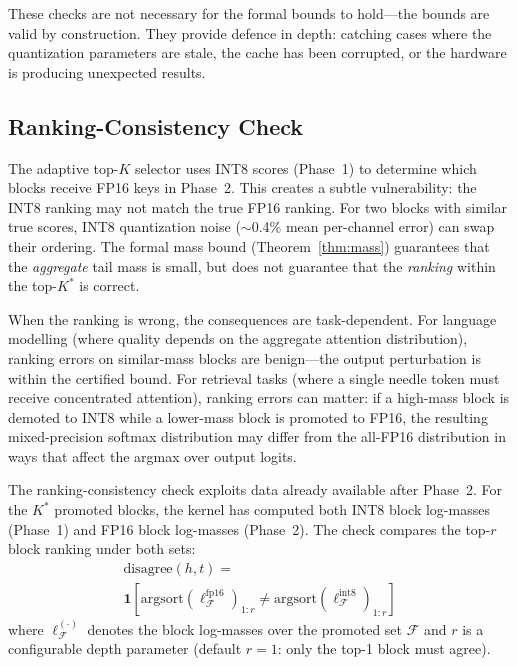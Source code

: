 \documentclass[10pt,twocolumn,a4paper]{article}
\theoremstyle{definition}
\theoremstyle{remark}
\begin{document}
These checks are not necessary for the formal bounds to hold---the bounds are valid by construction.  They provide defence in depth: catching cases where the quantization parameters are stale, the cache has been corrupted, or the hardware is producing unexpected results.

\subsection{Ranking-Consistency Check}
\label{sec:ranking_consistency}

The adaptive top-$K$ selector uses INT8 scores (Phase~1) to determine which blocks receive FP16 keys in Phase~2.  This creates a subtle vulnerability: the INT8 ranking may not match the true FP16 ranking.  For two blocks with similar true scores, INT8 quantization noise ($\sim$0.4\% mean per-channel error) can swap their ordering.  The formal mass bound (Theorem~\ref{thm:mass}) guarantees that the \emph{aggregate} tail mass is small, but does not guarantee that the \emph{ranking} within the top-$K^*$ is correct.

When the ranking is wrong, the consequences are task-dependent.  For language modelling (where quality depends on the aggregate attention distribution), ranking errors on similar-mass blocks are benign---the output perturbation is within the certified bound.  For retrieval tasks (where a single needle token must receive concentrated attention), ranking errors can matter: if a high-mass block is demoted to INT8 while a lower-mass block is promoted to FP16, the resulting mixed-precision softmax distribution may differ from the all-FP16 distribution in ways that affect the argmax over output logits.

The ranking-consistency check exploits data already available after Phase~2.  For the $K^*$ promoted blocks, the kernel has computed both INT8 block log-masses (Phase~1) and FP16 block log-masses (Phase~2).  The check compares the top-$r$ block ranking under both sets:
\begin{multline}
  \mathrm{disagree}(h, t) = \\
  \mathbf{1}\!\left[\mathrm{argsort}(\ell^{\mathrm{fp16}}_{\mathcal{F}})_{1:r}
  \neq \mathrm{argsort}(\ell^{\mathrm{int8}}_{\mathcal{F}})_{1:r}\right]
\end{multline}
where $\ell^{(\cdot)}_{\mathcal{F}}$ denotes the block log-masses over the promoted set $\mathcal{F}$ and $r$ is a configurable depth parameter (default $r{=}1$: only the top-1 block must agree).
\end{document}
